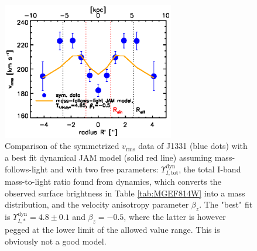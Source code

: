 
\begin{figure}
  \centering
  \includegraphics[height=6cm]{fig/jam_A2_vrms.ps}
  \caption{Comparison of the symmetrized $v_\text{rms}$ data of J1331 (blue dots) with a best fit dynamical JAM model (solid red line) assuming mass-follows-light and with two free parameters: $\Upsilon_{I,\text{tot}}^\text{dyn}$, the total I-band mass-to-light ratio found from dynamics, which converts the observed surface brightness in Table \ref{tab:MGEF814W} into a mass distribution, and the velocity anisotropy parameter $\beta_z$. The "best" fit is $\Upsilon_{I,*}^\text{dyn} = 4.8 \pm 0.1$ and $\beta_z = -0.5$, where the latter is however pegged at the lower limit of the allowed value range. This is obviously not a good model.}
  \label{fig:JAM_modelA2}
\end{figure}


